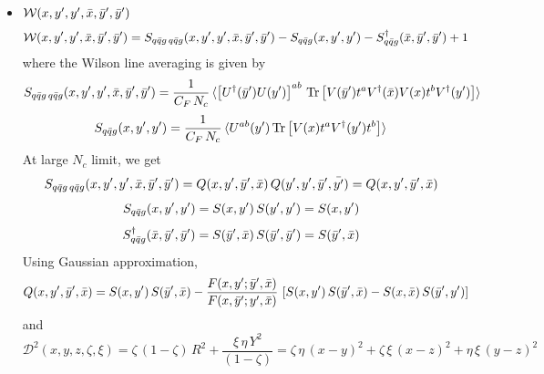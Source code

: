 \documentclass[9pt]{article}
\numberwithin{equation}{section}
\begin{document}
\begin{itemize}
\begin{align}
    Q(x,z,\Bar{y}',\Bar{x}) & = S(x,z)\,S(\Bar{y}',\Bar{x}) - \frac{F(x,z;\Bar{y}',\Bar{x})}{F(x,\Bar{y}';z,\Bar{x})}\, \left[S(x,z)\,S(\Bar{y}',\Bar{x})-S(x,\Bar{x})\, S(\Bar{y}',z)\right]
\end{align}
\item $\mathcal{W}(x,y',y',\Bar{x},\Bar{y}',\Bar{y}')$
    \begin{align}
        \mathcal{W}(x,y',y',\Bar{x},\Bar{y}',\Bar{y}') & = S_{q\Bar{q}g\,q\Bar{q}g}(x,y',y',\Bar{x},\Bar{y}',\Bar{y}') -S_{q\Bar{q}g}(x,y',y') - S^{\dagger}_{q\Bar{q}g}(\Bar{x},\Bar{y}',\Bar{y}') + 1
    \end{align}
where the Wilson line averaging is given by 
$$S_{q\Bar{q}g\,q\Bar{q}g}(x,y',y',\Bar{x},\Bar{y}',\Bar{y}') = \frac{1}{C_{F}\,N_{c}}\, \langle \left[U^{\dagger}(\Bar{y}')U(y')\right]^{ab}\, \text{Tr}\left[V(\Bar{y}')t^{a}V^{\dagger}(\Bar{x})V(x)t^{b}V^{\dagger}(y')\right] \rangle$$
$$S_{q\Bar{q}g}(x,y',y') =  \frac{1}{C_{F}\,N_{c}}\, \langle U^{ab}(y')\,\text{Tr}\left[V(x)t^{a}V^{\dagger}(y')t^{b}\right]\rangle$$
At large $N_{c}$ limit, we get
$$S_{q\Bar{q}g\,q\Bar{q}g}(x,y',y',\Bar{x},\Bar{y}',\Bar{y}') = Q(x,y',\Bar{y}',\Bar{x})\, Q(y',y',\Bar{y}',\Bar{y'}) = Q(x,y',\Bar{y}',\Bar{x}) $$
$$S_{q\Bar{q}g}(x,y',y') = S(x,y')\, S(y',y') = S(x,y')$$
$$S^{\dagger}_{q\Bar{q}g}(\Bar{x},\Bar{y}',\Bar{y}') = S(\Bar{y}',\Bar{x})\, S(\Bar{y}',\Bar{y}') = S(\Bar{y}',\Bar{x})$$
Using Gaussian approximation,
\begin{align}
    Q(x,y',\Bar{y}',\Bar{x}) & = S(x,y')\,S(\Bar{y}',\Bar{x}) - \frac{F(x,y';\Bar{y}',\Bar{x})}{F(x,\Bar{y}';y',\Bar{x})}\, \left[S(x,y')\,S(\Bar{y}',\Bar{x})-S(x,\Bar{x})\, S(\Bar{y}',y')\right]
\end{align}
and  $$\mathcal{D}^{2}(x,y,z,\zeta,\xi) = \zeta\,(1-\zeta)\,R^{2} + \frac{\xi\,\eta\,Y^{2}}{(1-\zeta)} = \zeta\,\eta\,(x-y)^{2} + \zeta\,\xi\,(x-z)^{2} + \eta\,\xi\,(y-z)^{2}$$
\end{itemize}
\end{document}
